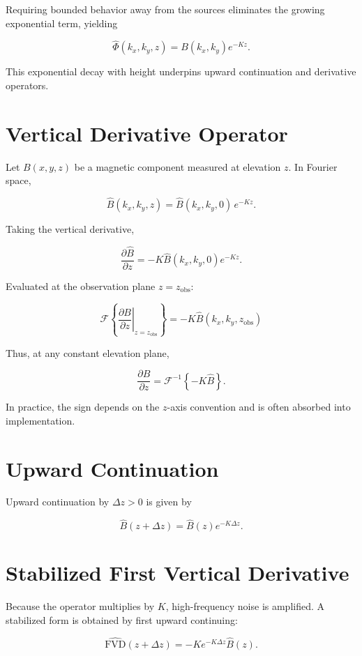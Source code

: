 \documentclass[11pt]{article}
\begin{document}
Requiring bounded behavior away from the sources eliminates the growing exponential term, yielding

\[
\hat{\Phi}(k_x,k_y,z)
=
B(k_x,k_y)e^{-Kz}.
\]

This exponential decay with height underpins upward continuation and derivative operators.

\section{Vertical Derivative Operator}

Let $B(x,y,z)$ be a magnetic component measured at elevation $z$.
In Fourier space,

\[
\hat{B}(k_x,k_y,z)
=
\hat{B}(k_x,k_y,0)\,e^{-Kz}.
\]

Taking the vertical derivative,

\[
\frac{\partial \hat{B}}{\partial z}
=
- K \hat{B}(k_x,k_y,0)e^{-Kz}.
\]

Evaluated at the observation plane $z = z_{\text{obs}}$:

\[
\boxed{
\mathcal{F}
\left\{
\left.
\frac{\partial B}{\partial z}
\right|_{z=z_{\text{obs}}}
\right\}
=
- K \hat{B}(k_x,k_y,z_{\text{obs}})
}
\]

Thus, at any constant elevation plane,

\[
\boxed{
\frac{\partial B}{\partial z}
=
\mathcal{F}^{-1}
\left\{
- K \hat{B}
\right\}.
}
\]

In practice, the sign depends on the $z$-axis convention and is often absorbed into implementation.

\section{Upward Continuation}

Upward continuation by $\Delta z > 0$ is given by

\[
\hat{B}(z+\Delta z)
=
\hat{B}(z)e^{-K\Delta z}.
\]

\section{Stabilized First Vertical Derivative}

Because the operator multiplies by $K$, high-frequency noise is amplified.
A stabilized form is obtained by first upward continuing:

\[
\boxed{
\widehat{\text{FVD}}(z+\Delta z)
=
- K e^{-K\Delta z} \hat{B}(z).
}
\]
\end{document}
